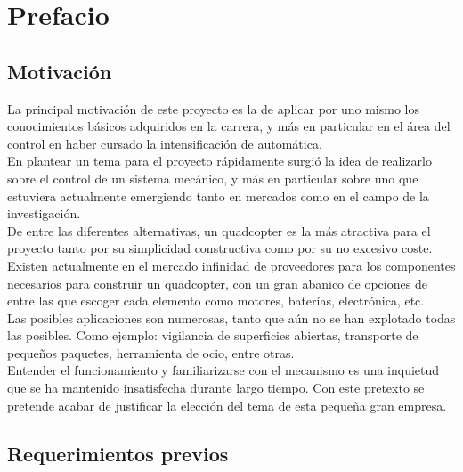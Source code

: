 \documentclass[twoside,11pt]{book}
\begin{document}
\setcounter{page}{1}
\tableofcontents
{}
\fancyfoot[C]{}
\newpage
\fancyhead[LE,RO]{\thepage}
\setcounter{page}{4}
\listoffigures
\newpage

\chapter{Prefacio} \label{prefacio}
\section{Motivación}

La principal motivación de este proyecto es la de aplicar por uno mismo los conocimientos básicos adquiridos en la carrera, y más en particular en el área del control en haber cursado la intensificación de automática.\\

En plantear un tema para el proyecto rápidamente surgió la idea de realizarlo sobre el control de un sistema mecánico, y más en particular sobre uno que estuviera actualmente emergiendo tanto en mercados como en el campo de la investigación.\\ 

De entre las diferentes alternativas, un quadcopter es la más atractiva para el proyecto tanto por su simplicidad constructiva como por su no excesivo coste. Existen actualmente en el mercado infinidad de proveedores para los componentes necesarios para construir un quadcopter, con un gran abanico de opciones de entre las que escoger cada elemento como motores, baterías, electrónica, etc.\\

Las posibles aplicaciones son numerosas, tanto que aún no se han explotado todas las posibles. Como ejemplo: vigilancia de superficies abiertas, transporte de pequeños paquetes, herramienta de ocio, entre otras.\\

Entender el funcionamiento y familiarizarse con el mecanismo es una inquietud que se ha mantenido insatisfecha durante largo tiempo. Con este pretexto se pretende acabar de justificar la elección del tema de esta pequeña gran empresa.

\section{Requerimientos previos}
\end{document}
